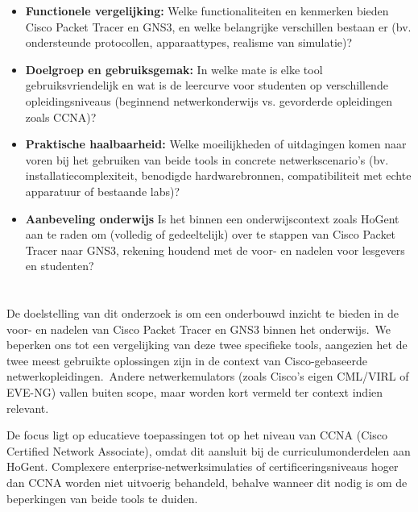 \begin{itemize}
    \item \textbf{Functionele vergelijking:} Welke functionaliteiten en kenmerken bieden Cisco Packet Tracer en GNS3, en welke belangrijke verschillen bestaan er (bv. ondersteunde protocollen, apparaattypes, realisme van simulatie)?
    
    \item \textbf{Doelgroep en gebruiksgemak:} In welke mate is elke tool gebruiksvriendelijk en wat is de leercurve voor studenten op verschillende opleidingsniveaus (beginnend netwerkonderwijs vs. gevorderde opleidingen zoals CCNA)?
    
    \item \textbf{Praktische haalbaarheid:} Welke moeilijkheden of uitdagingen komen naar voren bij het gebruiken van beide tools in concrete netwerkscenario’s (bv. installatiecomplexiteit, benodigde hardwarebronnen, compatibiliteit met echte apparatuur of bestaande labs)?
    
    \item \textbf{Aanbeveling onderwijs} Is het binnen een onderwijscontext zoals HoGent aan te raden om (volledig of gedeeltelijk) over te stappen van Cisco Packet Tracer naar GNS3, rekening houdend met de voor- en nadelen voor lesgevers en studenten?
    

\end{itemize}
\section{}%
\label{sec:onderzoeksdoelstelling}

De doelstelling van dit onderzoek is om een onderbouwd inzicht te bieden in de voor- en nadelen van Cisco Packet Tracer en GNS3 binnen het onderwijs. We beperken ons tot een vergelijking van deze twee specifieke tools, aangezien het de twee meest gebruikte oplossingen zijn in de context van Cisco-gebaseerde netwerkopleidingen. Andere netwerkemulators (zoals Cisco’s eigen CML/VIRL of EVE-NG) vallen buiten scope, maar worden kort vermeld ter context indien relevant. 

\vspace{0.3cm}

De focus ligt op educatieve toepassingen tot op het niveau van CCNA (Cisco Certified Network Associate), omdat dit aansluit bij de curriculumonderdelen aan HoGent. Complexere enterprise-netwerksimulaties of certificeringsniveaus hoger dan CCNA worden niet uitvoerig behandeld, behalve wanneer dit nodig is om de beperkingen van beide tools te duiden.

